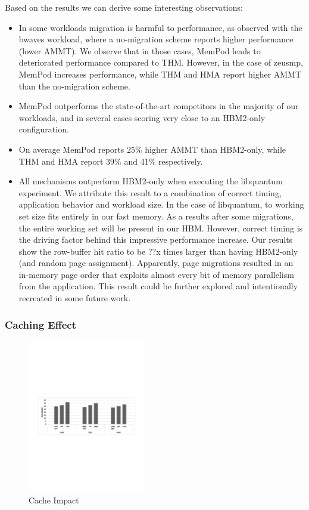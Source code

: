 Based on the results we can derive some interesting observations:
\begin{itemize}[leftmargin=0.4cm]
\setlength\itemsep{0em}
	\item In some workloads migration is harmful to performance, as observed with the bwaves workload, where a no-migration scheme reports higher performance (lower AMMT). We observe that in those cases, MemPod leads to deteriorated performance compared to THM. However, in the case of zeusmp, MemPod increases performance, while THM and HMA report higher AMMT than the no-migration scheme.
	\item MemPod outperforms the state-of-the-art competitors in the majority of our workloads, and in several cases scoring very close to an HBM2-only configuration. 
	\item On average MemPod reports 25\% higher AMMT than HBM2-only, while THM and HMA report 39\% and 41\% respectively.
	\item All mechanisms outperform HBM2-only when executing the libquantum experiment. We attribute this result to a combination of correct timing, application behavior and workload size. In the case of libquantum, to working set size fits entirely in our fast memory. As a results after some migrations, the entire working set will be present in our HBM. However, correct timing is the driving factor behind this impressive performance increase. Our results show the row-buffer hit ratio to be ??x times larger than having HBM2-only (and random page assignment). Apparently, page migrations resulted in an in-memory page order that exploits almost every bit of memory parallelism from the application. This result could be further explored and intentionally recreated in some future work.
\end{itemize}

\subsubsection{Caching Effect}

\begin{figure}
  \includegraphics[width=0.46\textwidth]{figures/cache_impact.pdf}
  \caption{Cache Impact}
  \label{fig:cache}
\end{figure}

